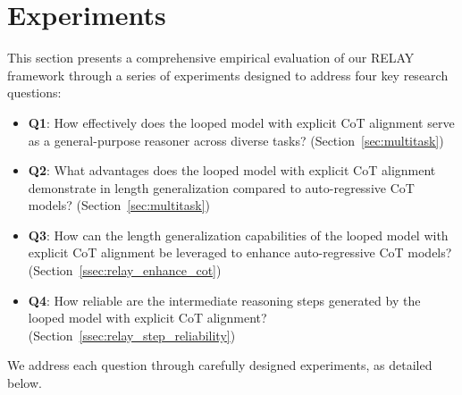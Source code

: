\section{Experiments}\label{sec:exp}

This section presents a comprehensive empirical evaluation of our RELAY framework through a series of experiments designed to address four key research questions:
\vspace{-6pt}
\begin{itemize}
\item \textbf{Q1}: How effectively does the looped model with explicit CoT alignment serve as a general-purpose reasoner across diverse tasks?
(Section~\ref{sec:multitask})
\item \textbf{Q2}: What advantages does the looped model with explicit CoT alignment demonstrate in length generalization compared to auto-regressive CoT models?
(Section~\ref{sec:multitask})
\item \textbf{Q3}: How can the length generalization capabilities of the looped model with explicit CoT alignment be leveraged to enhance auto-regressive CoT models?
(Section~\ref{ssec:relay_enhance_cot})
\item \textbf{Q4}: How reliable are the intermediate reasoning steps generated by the looped model with explicit CoT alignment?
(Section~\ref{ssec:relay_step_reliability})
\end{itemize}
\vspace{-6pt}
We address each question through carefully designed experiments, as detailed below.


